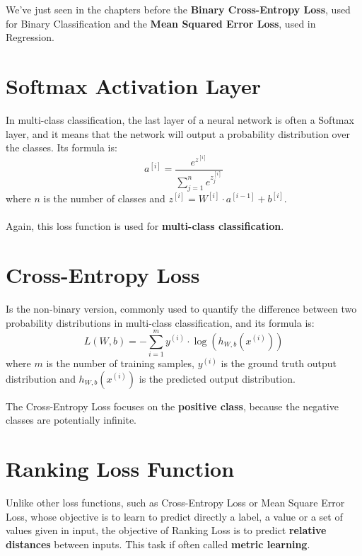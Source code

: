 \documentclass[oneside]{academica}
\begin{document}
We've just seen in the chapters before the \textbf{Binary Cross-Entropy Loss}, used for Binary Classification and the \textbf{Mean Squared Error Loss}, used in Regression.

\section{Softmax Activation Layer}

In multi-class classification, the last layer of a neural network is often a Softmax layer, and it means that the network will output a probability distribution over the classes.
Its formula is:
\begin{equation*}
  a^{[i]} = \frac{e^{z^{[i]}}}{\sum_{j=1}^{n} e^{z_j^{[i]}}}
\end{equation*}
where $n$ is the number of classes and $z^{[i]} = W^{[i]} \cdot a^{[i-1]} + b^{[i]}$.
\\\\
Again, this loss function is used for \textbf{multi-class classification}.

\section{Cross-Entropy Loss}

Is the non-binary version, commonly used to quantify the difference between two probability distributions in multi-class classification, and its formula is:
\begin{equation*}
  L(W,b) = - \sum_{i=1}^{m} y^{(i)} \cdot \log \left( h_{W,b} \left( x^{(i)} \right) \right)
\end{equation*}
where $m$ is the number of training samples, $y^{(i)}$ is the ground truth output distribution and $h_{W,b} \left( x^{(i)} \right)$ is the predicted output distribution.

The Cross-Entropy Loss focuses on the \textbf{positive class}, because the negative classes are potentially infinite.

\section{Ranking Loss Function}

Unlike other loss functions, such as Cross-Entropy Loss or Mean Square Error Loss, whose objective is to learn to predict directly a label, a value or a set of values given in input, the objective of Ranking Loss is to predict \textbf{relative distances} between inputs. This task if often called \textbf{metric learning}.
\end{document}
